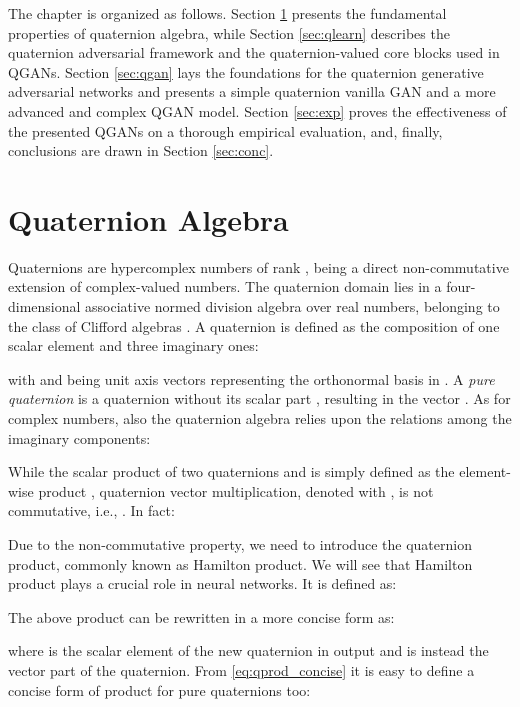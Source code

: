 \documentclass[graybox]{svmult}
\begin{document}
The chapter is organized as follows. Section \ref{sec:qalg} presents the fundamental properties of quaternion algebra, while Section \ref{sec:qlearn} describes the quaternion adversarial framework and the quaternion-valued core blocks used in QGANs. Section \ref{sec:qgan} lays the foundations for the quaternion generative adversarial networks and presents a simple quaternion vanilla GAN and a more advanced and complex QGAN model. Section \ref{sec:exp} proves the effectiveness of the presented QGANs on a thorough empirical evaluation, and, finally, conclusions are drawn in Section \ref{sec:conc}.


\section{Quaternion Algebra}
\label{sec:qalg}
\noindent Quaternions are hypercomplex numbers of rank , being a direct non-commutative extension of complex-valued numbers. The quaternion domain  lies in a four-dimensional associative normed division algebra over real numbers, belonging to the class of Clifford algebras \cite{Ward1997}.
A quaternion is defined as the composition of one scalar element and three imaginary ones:



\noindent with  and being  unit axis vectors representing the orthonormal basis in . A \textit{pure quaternion} is a quaternion without its scalar part , resulting in the vector . As for complex numbers, also the quaternion algebra relies upon the relations among the imaginary components:



While the scalar product of two quaternions  and  is simply defined as the element-wise product , quaternion vector multiplication, denoted with , is not commutative, i.e., . In fact:



Due to the non-commutative property, we need to introduce the quaternion product, commonly known as Hamilton product. We will see that Hamilton product plays a crucial role in neural networks. It is defined as:



The above product can be rewritten in a more concise form as:



\noindent where  is the scalar element of the new quaternion in output and  is instead the vector part of the quaternion. From \eqref{eq:qprod_concise} it is easy to define a concise form of product for pure quaternions too:
\end{document}
